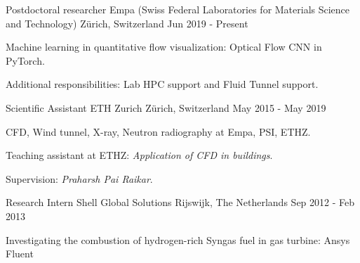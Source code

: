 \documentclass[11pt, a4paper]{preamble/awesome-cv-novo}
\begin{document}
\begin{cventries}

  \cventry
    {Postdoctoral researcher} %
    {Empa (Swiss Federal Laboratories for Materials Science and Technology)} %
    {Z\"urich, Switzerland} %
    {Jun 2019 - Present} %
    {
      \begin{cvitems} %
        \item {Machine learning in quantitative flow visualization: Optical Flow CNN in PyTorch.}
        \item {Additional responsibilities: Lab HPC support and Fluid Tunnel support.}
      \end{cvitems}
    }

  \cventry
    {Scientific Assistant}
    {ETH Zurich}
    {Z\"urich, Switzerland}
    {May 2015 - May 2019}
    {
      \begin{cvitems}
        \item {CFD, Wind tunnel, X-ray, Neutron radiography at Empa, PSI, ETHZ.}
        \item {Teaching assistant at ETHZ: \textit{Application of CFD in buildings}.}
        \item {Supervision: \textit{Praharsh Pai Raikar}.}
      \end{cvitems}
    }

    \cventry
    {Research Intern}
    {Shell Global Solutions}
    {Rijswijk, The Netherlands}
    {Sep 2012 - Feb 2013}
    {
      \begin{cvitems}
        \item {Investigating the combustion of hydrogen-rich Syngas fuel in gas turbine: Ansys Fluent}
      \end{cvitems}
    }

\end{cventries}



\end{document}
